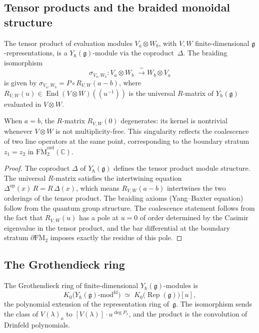 \subsection{Tensor products and the braided monoidal structure}

\begin{theorem}
\label{thm:eval-braiding}
The tensor product of evaluation modules $V_a\otimes W_b$,
with $V,W$ finite-dimensional $\mathfrak{g}$-representations,
is a $Y_\hbar(\mathfrak{g})$-module via the coproduct~$\Delta$.
The braiding isomorphism
\[
\sigma_{V_a,W_b}\colon
V_a\otimes W_b
\;\xrightarrow{\;\sim\;}
W_b\otimes V_a
\]
is given by $\sigma_{V_a,W_b}=P\circ R_{V,W}(a-b)$,
where $R_{V,W}(u)\in\operatorname{End}(V\otimes W)(\!(u^{-1})\!)$
is the universal $R$-matrix of $Y_\hbar(\mathfrak{g})$
evaluated in $V\otimes W$.

When $a=b$, the $R$-matrix $R_{V,W}(0)$ degenerates:
its kernel is nontrivial whenever $V\otimes W$ is not
multiplicity-free. This singularity reflects the
coalescence of two line operators at the same point,
corresponding to the boundary stratum
$z_1=z_2$ in $\overline{\mathrm{FM}}_2^{\mathrm{ord}}(\mathbb{C})$.
\end{theorem}

\begin{proof}
The coproduct $\Delta$ of $Y_\hbar(\mathfrak{g})$ defines
the tensor product module structure. The universal
$R$-matrix satisfies the intertwining equation
$\Delta^{\mathrm{op}}(x)\,R=R\,\Delta(x)$, which means
$R_{V,W}(a-b)$ intertwines the two orderings of the
tensor product. The braiding axioms (Yang--Baxter equation)
follow from the quantum group structure. The coalescence
statement follows from the fact that $R_{V,W}(u)$ has a
pole at $u=0$ of order determined by the Casimir eigenvalue
in the tensor product, and the bar differential at the
boundary stratum $\partial\overline{\mathrm{FM}}_2$
imposes exactly the residue of this pole.
\end{proof}

\subsection{The Grothendieck ring}

\begin{theorem}
\label{thm:grothendieck-yangian}
The Grothendieck ring of finite-dimensional
$Y_\hbar(\mathfrak{g})$-modules is
\begin{equation}\label{eq:grothendieck-yangian}
K_0\!\bigl(Y_\hbar(\mathfrak{g})\text{-}\mathrm{mod}^{\mathrm{fd}}\bigr)
\;\simeq\;
K_0\!\bigl(\operatorname{Rep}(\mathfrak{g})\bigr)[u],
\end{equation}
the polynomial extension of the representation ring
of~$\mathfrak{g}$. The isomorphism sends the class of
$V(\lambda)_a$ to $[V(\lambda)]\cdot u^{\deg P_\lambda}$,
and the product is the convolution of Drinfeld polynomials.
\end{theorem}

